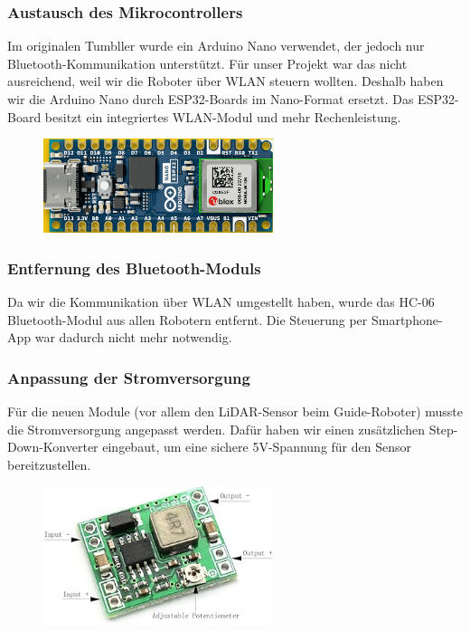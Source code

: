 \subsubsection{Austausch des Mikrocontrollers}
Im originalen Tumbller wurde ein Arduino Nano verwendet, der jedoch nur Bluetooth-Kommunikation unterstützt.
Für unser Projekt war das nicht ausreichend, weil wir die Roboter über WLAN steuern wollten.
Deshalb haben wir die Arduino Nano durch ESP32-Boards im Nano-Format ersetzt.
Das ESP32-Board besitzt ein integriertes WLAN-Modul und mehr Rechenleistung.
\begin{figure}[H]
    \includegraphics[width=0.6\textwidth, center]{img/Hardware/nanoesp32.png}
\end{figure}
\subsubsection{Entfernung des Bluetooth-Moduls}
Da wir die Kommunikation über WLAN umgestellt haben, wurde das HC-06 Bluetooth-Modul aus allen Robotern entfernt.
Die Steuerung per Smartphone-App war dadurch nicht mehr notwendig.
\subsubsection{Anpassung der Stromversorgung}
Für die neuen Module (vor allem den LiDAR-Sensor beim Guide-Roboter) musste die Stromversorgung angepasst werden.
Dafür haben wir einen zusätzlichen Step-Down-Konverter eingebaut, um eine sichere 5V-Spannung für den Sensor bereitzustellen.
\begin{figure}[H]
    \includegraphics[width=0.6\textwidth, center]{img/Hardware/stepdown.png}
\end{figure}
